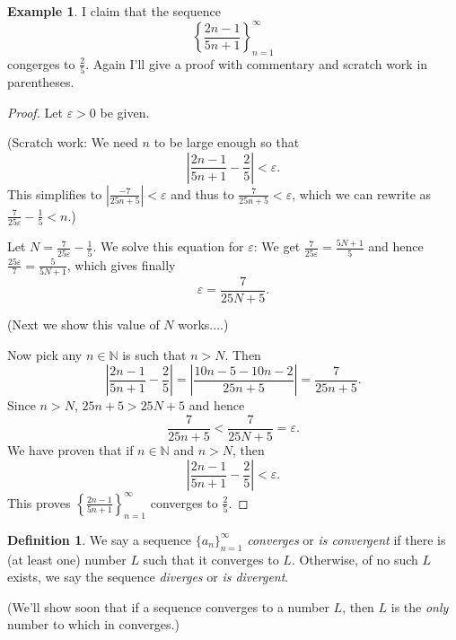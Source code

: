 \documentclass[12pt]{amsart}
\def\e{\varepsilon}
\newcommand{\N}{\mathbb{N}}
\numberwithin{equation}{section}
\theoremstyle{plain} %
\theoremstyle{definition}
\newtheorem{defn}[equation]{Definition}
\newtheorem{ex}[equation]{Example}
\theoremstyle{remark}
\begin{document}
\begin{ex} I claim that the sequence
$$
\left\{ \frac{2n - 1}{5n + 1} \right\}_{n=1}^\infty
$$
congerges to $\frac{2}{5}$.  Again I'll give a proof with commentary and scratch work in parentheses.

\begin{proof} 
Let $\e > 0$ be given. 

(Scratch work: We need $n$ to be large enough so that
$$
\left|\frac{2n - 1}{5n + 1} - \frac{2}{5}\right| < \e.
$$
This simplifies to 
$\left|\frac{-7}{25n + 5}\right| < \e$
and thus to
$\frac{7}{25n + 5} < \e$, which we can rewrite as $\frac{7}{25\e} - \frac15 < n$.)

Let $N = \frac{7}{25\e} - \frac15$. We solve this equation for $\e$: We get
$\frac{7}{25 \e} = \frac{5N +  1}{5}$ and hence 
$\frac{25 \e}{7} = \frac{5}{5N +  1}$, which gives finally
$$
\e = \frac{7}{25N + 5}.
$$

(Next we show this value of $N$ works....)

Now pick any $n \in \N$ is such that
$n > N$. Then
$$
\left|\frac{2n - 1}{5n + 1} - \frac{2}{5}\right| 
= \left|\frac{10n - 5   - 10n -2               }{25n + 5} \right| 
=  \frac{7}{25n + 5}.
$$
Since $n > N$, $25n + 5> 25N + 5$ and hence
$$
\frac{7}{25n + 5} < \frac{7}{25N + 5} = \e.
$$
We have proven that if $n \in \N$ and $n > N$, then
$$
\left|\frac{2n - 1}{5n + 1} - \frac{2}{5}\right| < \e.
$$
This proves $\left\{ \frac{2n - 1}{5n + 1} \right\}_{n=1}^\infty$
converges to $\frac25$.
\end{proof}
\end{ex}




\begin{defn} We say a sequence $\{a_n\}_{n=1}^\infty$ {\em converges} or {\em is convergent} 
if there is (at least one) number $L$ such that it converges to $L$. Otherwise, of no such $L$ exists, we say the sequence {\em diverges} or 
  {\em is divergent}.
\end{defn}

(We'll show soon that if a sequence converges to a number $L$, then $L$ is the {\em only} number to which in converges.)
\end{document}
